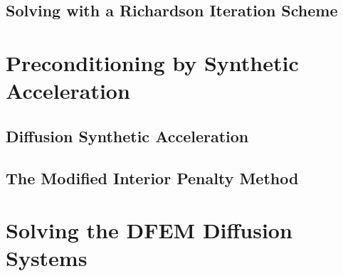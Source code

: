 \documentclass[preprint,review,12pt]{elsarticle}
\begin{document}


\subsection{Solving with a Richardson Iteration Scheme} \label{sec::trans_SI}


\section{Preconditioning by Synthetic Acceleration} \label{sec::accel}


\subsection{Diffusion Synthetic Acceleration} \label{sec::accel_DSA}

\subsection{The Modified Interior Penalty Method} \label{sec::accel_MIP}

\section{Solving the DFEM Diffusion Systems} \label{sec::solving}
\end{document}
